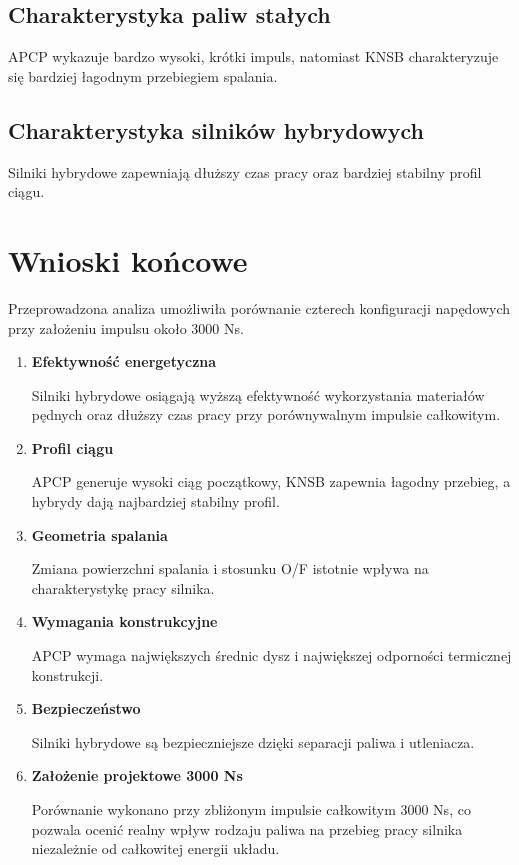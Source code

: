 \documentclass[a4paper,12pt]{article}
\begin{document}
\subsection{Charakterystyka paliw stałych}

APCP wykazuje bardzo wysoki, krótki impuls, natomiast KNSB charakteryzuje się bardziej łagodnym przebiegiem spalania.

\subsection{Charakterystyka silników hybrydowych}

Silniki hybrydowe zapewniają dłuższy czas pracy oraz bardziej stabilny profil ciągu.

\section{Wnioski końcowe}

Przeprowadzona analiza umożliwiła porównanie czterech konfiguracji napędowych przy założeniu impulsu około 3000 Ns.

\begin{enumerate}

\item \textbf{Efektywność energetyczna}

Silniki hybrydowe osiągają wyższą efektywność wykorzystania materiałów pędnych oraz dłuższy czas pracy przy porównywalnym impulsie całkowitym.

\item \textbf{Profil ciągu}

APCP generuje wysoki ciąg początkowy, KNSB zapewnia łagodny przebieg, a hybrydy dają najbardziej stabilny profil.

\item \textbf{Geometria spalania}

Zmiana powierzchni spalania i stosunku O/F istotnie wpływa na charakterystykę pracy silnika.

\item \textbf{Wymagania konstrukcyjne}

APCP wymaga największych średnic dysz i największej odporności termicznej konstrukcji.

\item \textbf{Bezpieczeństwo}

Silniki hybrydowe są bezpieczniejsze dzięki separacji paliwa i utleniacza.

\item \textbf{Założenie projektowe 3000 Ns}

Porównanie wykonano przy zbliżonym impulsie całkowitym 3000 Ns, co pozwala ocenić realny wpływ rodzaju paliwa na przebieg pracy silnika niezależnie od całkowitej energii układu.

\end{enumerate}
\end{document}
